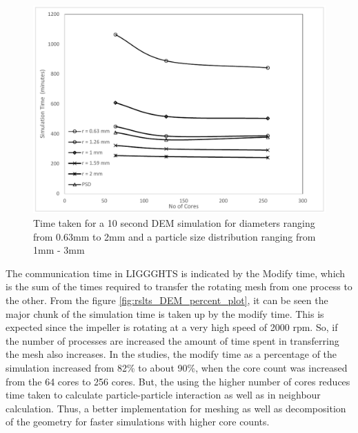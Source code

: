 \documentclass[preprint,11pt,authoryear]{elsarticle}
\begin{document}
\begin{figure}[H]
\centering
\includegraphics[scale=0.7]{rslts_DEM_timing_plots.pdf}
\caption{Time taken for a 10 second DEM simulation for diameters ranging from 0.63mm to 2mm and 
a particle size distribution ranging from 1mm - 3mm}
\label{fig:rslts_DEM_timing_studies}
\end{figure}
 The communication time in LIGGGHTS is indicated by the Modify time, which is the sum of the 
times required to transfer the rotating mesh from one process to the other. From the figure 
\ref{fig:rslts_DEM_percent_plot}, it can be seen the major chunk of the simulation time is taken up by 
the modify time. This is expected since the impeller is rotating at a very high speed of 2000 rpm. So, if 
the number of processes are increased the amount of time spent in transferring the mesh also 
increases. In the studies, the modify time as a percentage of the simulation increased from 82\% to 
about 90\%, when the core count was increased from the 64 cores to 256 cores. But, the using the 
higher number of cores reduces time taken to calculate particle-particle interaction as well as in 
neighbour calculation. Thus, a better implementation for meshing as well as decomposition of the 
geometry for faster simulations with higher core counts.
\end{document}
